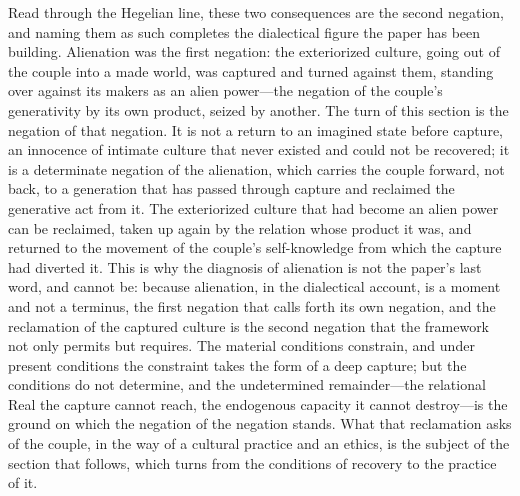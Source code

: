 Read through the Hegelian line, these two consequences are the second negation, and naming them as such completes the dialectical figure the paper has been building. Alienation was the first negation: the exteriorized culture, going out of the couple into a made world, was captured and turned against them, standing over against its makers as an alien power---the negation of the couple's generativity by its own product, seized by another. The turn of this section is the negation of that negation. It is not a return to an imagined state before capture, an innocence of intimate culture that never existed and could not be recovered; it is a determinate negation of the alienation, which carries the couple forward, not back, to a generation that has passed through capture and reclaimed the generative act from it. The exteriorized culture that had become an alien power can be reclaimed, taken up again by the relation whose product it was, and returned to the movement of the couple's self-knowledge from which the capture had diverted it. This is why the diagnosis of alienation is not the paper's last word, and cannot be: because alienation, in the dialectical account, is a moment and not a terminus, the first negation that calls forth its own negation, and the reclamation of the captured culture is the second negation that the framework not only permits but requires. The material conditions constrain, and under present conditions the constraint takes the form of a deep capture; but the conditions do not determine, and the undetermined remainder---the relational Real the capture cannot reach, the endogenous capacity it cannot destroy---is the ground on which the negation of the negation stands. What that reclamation asks of the couple, in the way of a cultural practice and an ethics, is the subject of the section that follows, which turns from the conditions of recovery to the practice of it.
